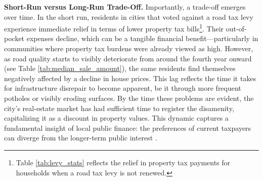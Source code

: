 {\bf Short-Run versus Long-Run Trade-Off.} Importantly, a trade-off emerges over time. In the short run, residents in cities that voted against a road tax levy experience immediate relief in terms of lower property tax bills\footnote{Table \ref{tab:levy_stats} reflects the relief in property tax payments for households when a road tax levy is not renewed.}. Their out-of-pocket expenses decline, which can be a tangible financial benefit—particularly in communities where property tax burdens were already viewed as high. However, as road quality starts to visibly deteriorate from around the fourth year onward (see Table \ref{tab:median_sale_amount}), the same residents find themselves negatively affected by a decline in house prices. This lag reflects the time it takes for infrastructure disrepair to become apparent, be it through more frequent potholes or visibly eroding surfaces. By the time these problems are evident, the city’s real-estate market has had sufficient time to register the disamenity, capitalizing it as a discount in property values. This dynamic captures a fundamental insight of local public finance: the preferences of current taxpayers can diverge from the longer-term public interest \citep{BuchananTullock1962, AlesinaTabellini1990}. 



